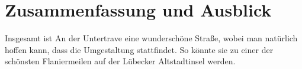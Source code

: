 
\chapter{Zusammenfassung und Ausblick}
\label{chapter-fazit}

Insgesamt ist An der Untertrave eine wunderschöne Straße, wobei man natürlich hoffen kann, dass die Umgestaltung stattfindet. So könnte sie zu einer der schönsten Flaniermeilen auf der Lübecker Altstadtinsel werden.